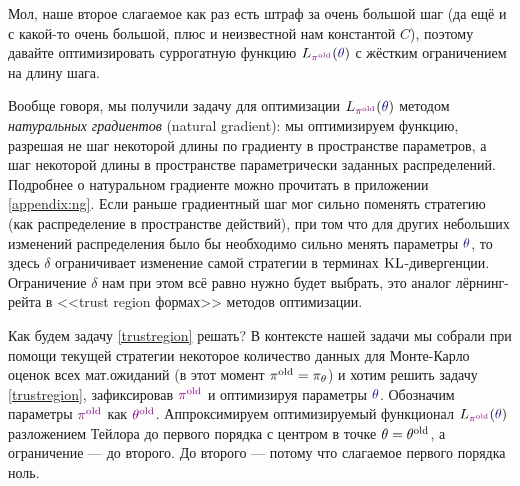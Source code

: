 Мол, наше второе слагаемое как раз есть штраф за очень большой шаг (да ещё и с какой-то очень большой, плюс и неизвестной нам константой $C$), поэтому давайте оптимизировать суррогатную функцию $L_{\textcolor{ChadPurple}{\pi^{\old}}}(\textcolor{ChadBlue}{\theta})$ с жёстким ограничением на длину шага.

Вообще говоря, мы получили задачу для оптимизации $L_{\textcolor{ChadPurple}{\pi^{\old}}}(\textcolor{ChadBlue}{\theta})$ методом \emph{натуральных градиентов} (natural gradient): мы оптимизируем функцию, разрешая не шаг некоторой длины по градиенту в пространстве параметров, а шаг некоторой длины в пространстве параметрически заданных распределений. Подробнее о натуральном градиенте можно прочитать в приложении \ref{appendix:ng}. Если раньше градиентный шаг мог сильно поменять стратегию (как распределение в пространстве действий), при том что для других небольших изменений распределения было бы необходимо сильно менять параметры $\textcolor{ChadBlue}{\theta}$, то здесь $\delta$ ограничивает изменение самой стратегии в терминах $\operatorname{KL}$-дивергенции. Ограничение $\delta$ нам при этом всё равно нужно будет выбрать, это аналог лёрнинг-рейта в <<trust region формах>> методов оптимизации.

Как будем задачу \ref{trustregion} решать? В контексте нашей задачи мы собрали при помощи текущей стратегии некоторое количество данных для Монте-Карло оценок всех мат.ожиданий (в этот момент $\pi^{\old} \HM= \pi_\theta$) и хотим решить задачу \ref{trustregion}, зафиксировав $\textcolor{ChadPurple}{\pi^{\old}}$ и оптимизируя параметры $\textcolor{ChadBlue}{\theta}$. Обозначим параметры $\textcolor{ChadPurple}{\pi^{\old}}$ как $\textcolor{ChadPurple}{\theta^{\old}}$. Аппроксимируем оптимизируемый функционал $L_{\textcolor{ChadPurple}{\pi^{\old}}}(\textcolor{ChadBlue}{\theta})$ разложением Тейлора до первого порядка с центром в точке $\theta = \theta^{\mathrm{old}}$, а ограничение --- до второго. До второго --- потому что слагаемое первого порядка ноль.

